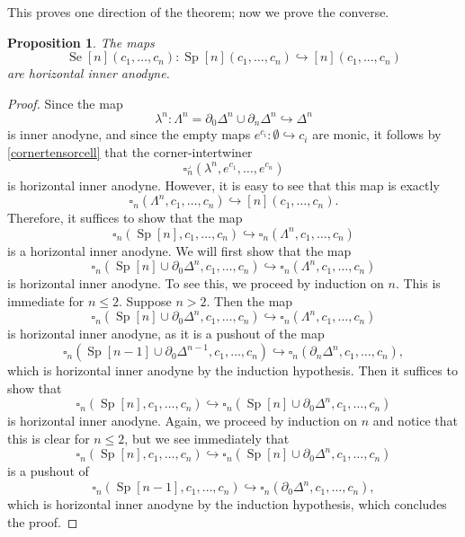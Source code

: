 \documentclass{amsart}
\numberwithin{equation}{section}
\theoremstyle{plain}   %
\newtheorem{prop}[subsection]{Proposition}
\theoremstyle{remark}
\theoremstyle{plain}
\begin{document}
This proves one direction of the theorem; now we prove the converse.
\begin{prop} The maps \[\operatorname{Se}[n](c_1,\dots,c_n):\operatorname{Sp}[n](c_1,\dots,c_n) \hookrightarrow [n](c_1,\dots,c_n)\] are horizontal inner anodyne.
\end{prop}
\begin{proof} 
	Since the map 
	\[\lambda^n: \Lambda^n=\partial_0 \Delta^n \cup \partial_n\Delta^n \hookrightarrow \Delta^n\]
	is inner anodyne, and since the empty maps \(e^{c_i}:\emptyset \hookrightarrow c_i\) are monic, it follows by \ref{cornertensorcell} that the corner-intertwiner 
	\[\square^\lrcorner_n(\lambda^n,e^{c_1},\dots,e^{c_n})\]
	is horizontal inner anodyne.  However, it is easy to see that this map is exactly \[\square_n(\Lambda^n,c_1,\dots,c_n) \hookrightarrow [n](c_1,\dots,c_n).\]  Therefore, it suffices to show that the map 
	\[\square_n(\operatorname{Sp}[n],c_1,\dots,c_n) \hookrightarrow \square_n(\Lambda^n,c_1,\dots,c_n)\] is a horizontal inner anodyne.  We will first show that the map 
	\[\square_n(\operatorname{Sp}[n]\cup \partial_0\Delta^n,c_1,\dots,c_n) \hookrightarrow \square_n(\Lambda^n,c_1,\dots,c_n)\] is horizontal inner anodyne.  
	To see this, we proceed by induction on \(n\).  This is immediate for \(n\leq 2\). Suppose \(n>2\).  Then the map 
	\[\square_n(\operatorname{Sp}[n]\cup \partial_0\Delta^n,c_1,\dots,c_n) \hookrightarrow \square_n(\Lambda^n,c_1,\dots,c_n)\] is horizontal inner anodyne, as it is a pushout of the map 
	\[\square_n(\operatorname{Sp}[n-1]\cup \partial_0\Delta^{n-1},c_1,\dots,c_n) \hookrightarrow \square_n(\partial_n \Delta^n,c_1,\dots,c_n),\]
	which is horizontal inner anodyne by the induction hypothesis.  Then it suffices to show that 
	\[\square_n(\operatorname{Sp}[n],c_1,\dots,c_n) \hookrightarrow \square_n(\operatorname{Sp}[n]\cup \partial_0\Delta^n,c_1,\dots,c_n)\] is horizontal inner anodyne.  Again, we proceed by induction on \(n\) and notice that this is clear for \(n\leq 2\), but we see immediately that \[\square_n(\operatorname{Sp}[n],c_1,\dots,c_n) \hookrightarrow \square_n(\operatorname{Sp}[n]\cup \partial_0\Delta^n,c_1,\dots,c_n)\] is a pushout of 
	\[\square_n(\operatorname{Sp}[n-1],c_1,\dots,c_n) \hookrightarrow \square_n(\partial_0 \Delta^n ,c_1,\dots,c_n),\]
	which is horizontal inner anodyne by the induction hypothesis, which concludes the proof.
\end{proof}
\end{document}
